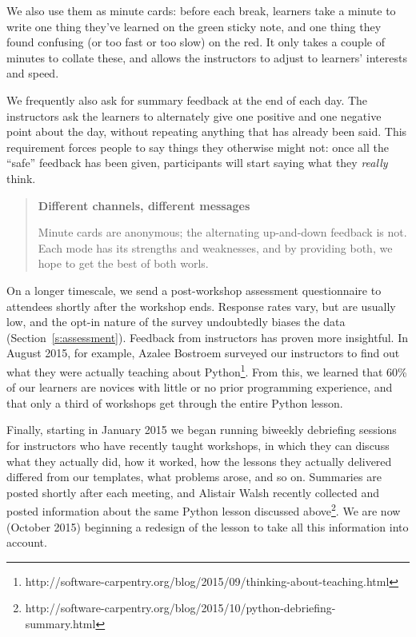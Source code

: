 \documentclass[10pt,a4paper,twocolumn]{article}
\begin{document}
We also use them as minute cards: before each break, learners take a
minute to write one thing they've learned on the green sticky note,
and one thing they found confusing (or too fast or too slow) on the
red. It only takes a couple of minutes to collate these, and allows
the instructors to adjust to learners' interests and speed.

We frequently also ask for summary feedback at the end of each day.
The instructors ask the learners to alternately give one positive and
one negative point about the day, without repeating anything that has
already been said.  This requirement forces people to say things they
otherwise might not: once all the ``safe'' feedback has been given,
participants will start saying what they \emph{really} think.

\begin{quote}
\textbf{Different channels, different messages}

Minute cards are anonymous; the alternating up-and-down feedback is
not.  Each mode has its strengths and weaknesses, and by providing
both, we hope to get the best of both worls.
\end{quote}

On a longer timescale, we send a post-workshop assessment
questionnaire to attendees shortly after the workshop ends.  Response
rates vary, but are usually low, and the opt-in nature of the survey
undoubtedly biases the data (Section~\ref{s:assessment}).  Feedback
from instructors has proven more insightful.  In August 2015, for
example, Azalee Bostroem surveyed our instructors to find out what
they were actually teaching about
Python\footnote{http://software-carpentry.org/blog/2015/09/thinking-about-teaching.html}.
From this, we learned that 60\% of our learners are novices with
little or no prior programming experience, and that only a third of
workshops get through the entire Python lesson.

Finally, starting in January 2015 we began running biweekly debriefing
sessions for instructors who have recently taught workshops, in which
they can discuss what they actually did, how it worked, how the
lessons they actually delivered differed from our templates, what
problems arose, and so on.  Summaries are posted shortly after each
meeting, and Alistair Walsh recently collected and posted information
about the same Python lesson discussed
above\footnote{http://software-carpentry.org/blog/2015/10/python-debriefing-summary.html}.
We are now (October 2015) beginning a redesign of the lesson to take
all this information into account.
\end{document}

